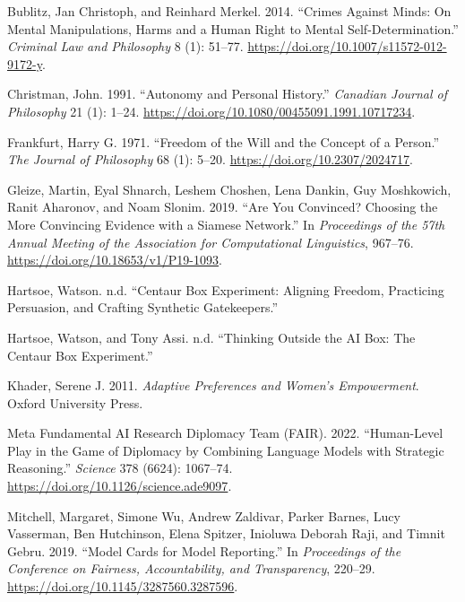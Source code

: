 \documentclass[
  10pt,
]{article}
\newlength{\cslhangindent}
\newenvironment{CSLReferences}[2] %
 {\begin{list}{}{%
  \setlength{\itemindent}{0pt}
  \setlength{\leftmargin}{0pt}
  \setlength{\parsep}{0pt}
  \ifodd #1
   \setlength{\leftmargin}{\cslhangindent}
   \setlength{\itemindent}{-1\cslhangindent}
  \fi
  \setlength{\itemsep}{#2\baselineskip}}}
 {\end{list}}
\begin{document}
\label{refs}
\begin{CSLReferences}{1}{0}
Bublitz, Jan Christoph, and Reinhard Merkel. 2014. {``Crimes Against
Minds: On Mental Manipulations, Harms and a Human Right to Mental
Self-Determination.''} \emph{Criminal Law and Philosophy} 8 (1): 51--77.
\url{https://doi.org/10.1007/s11572-012-9172-y}.

Christman, John. 1991. {``Autonomy and Personal History.''}
\emph{Canadian Journal of Philosophy} 21 (1): 1--24.
\url{https://doi.org/10.1080/00455091.1991.10717234}.

Frankfurt, Harry G. 1971. {``Freedom of the Will and the Concept of a
Person.''} \emph{The Journal of Philosophy} 68 (1): 5--20.
\url{https://doi.org/10.2307/2024717}.

Gleize, Martin, Eyal Shnarch, Leshem Choshen, Lena Dankin, Guy
Moshkowich, Ranit Aharonov, and Noam Slonim. 2019. {``Are You Convinced?
Choosing the More Convincing Evidence with a Siamese Network.''} In
\emph{Proceedings of the 57th Annual Meeting of the Association for
Computational Linguistics}, 967--76.
\url{https://doi.org/10.18653/v1/P19-1093}.

Hartsoe, Watson. n.d. {``Centaur Box Experiment: Aligning Freedom,
Practicing Persuasion, and Crafting Synthetic Gatekeepers.''}

Hartsoe, Watson, and Tony Assi. n.d. {``Thinking Outside the AI Box: The
Centaur Box Experiment.''}

Khader, Serene J. 2011. \emph{Adaptive Preferences and Women's
Empowerment}. Oxford University Press.

Meta Fundamental AI Research Diplomacy Team (FAIR). 2022. {``Human-Level
Play in the Game of Diplomacy by Combining Language Models with
Strategic Reasoning.''} \emph{Science} 378 (6624): 1067--74.
\url{https://doi.org/10.1126/science.ade9097}.

Mitchell, Margaret, Simone Wu, Andrew Zaldivar, Parker Barnes, Lucy
Vasserman, Ben Hutchinson, Elena Spitzer, Inioluwa Deborah Raji, and
Timnit Gebru. 2019. {``Model Cards for Model Reporting.''} In
\emph{Proceedings of the Conference on Fairness, Accountability, and
Transparency}, 220--29. \url{https://doi.org/10.1145/3287560.3287596}.


\end{CSLReferences}
\end{document}
